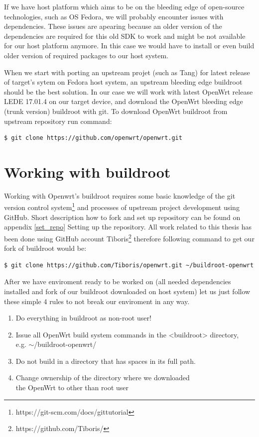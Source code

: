 If we have host platform which aims to be on the bleeding edge of open-source technologies, such as OS Fedora, we will probably encounter issues with dependencies.
These issues are apearing because an older version of the dependencies are required for this old SDK to work and might be not available for our host platform anymore.
In this case we would have to install or even build older version of required packages to our host system.

When we start with porting an upstream projet (such as Tang) for latest release of target's sytem on Fedora host system, an upstream bleeding edge buildroot should be the best solution.
In our case we will work with latest OpenWrt release LEDE 17.01.4 on our target device, and download the OpenWrt bleeding edge (trunk version) buildroot with git.
To download OpenWrt buildroot from upstream repository run command:
\begin{lstlisting}[columns=fixed,basicstyle=\ttfamily\footnotesize,tabsize=4,backgroundcolor=\color{yellow!10}]
$ git clone https://github.com/openwrt/openwrt.git
\end{lstlisting}

\section{Working with buildroot}\label{working-with-buildroot}

Working with Openwrt's buildroot requires some basic knowledge of the git version control system\footnote{https://git-scm.com/docs/gittutorial} and processes of upstream project development using GitHub.
Short description how to fork and set up repository can be found on appendix \ref{set_repo} Setting up the repository.
All work related to this thesis has been done using GitHub account Tiboris\footnote{https://github.com/Tiboris/} therefore following command to get our fork of buildroot would be:
\begin{lstlisting}[columns=fixed,basicstyle=\ttfamily\footnotesize,tabsize=4,backgroundcolor=\color{yellow!10}]
$ git clone https://github.com/Tiboris/openwrt.git ~/buildroot-openwrt
\end{lstlisting}

After we have enviroment ready to be worked on (all needed dependencies installed and fork of our buildroot downloaded on host system) let us just follow these simple 4 rules to not break our enviroment in any way.
\begin{enumerate}
    \item Do everything in buildroot as non-root user!
    \item Issue all OpenWrt build system commands in the <buildroot> directory, \\e.g. $\sim$/buildroot-openwrt/ %
    \item Do not build in a directory that has spaces in its full path.
    \item Change ownership of the directory where we downloaded \\the OpenWrt to other than root user
\end{enumerate}

